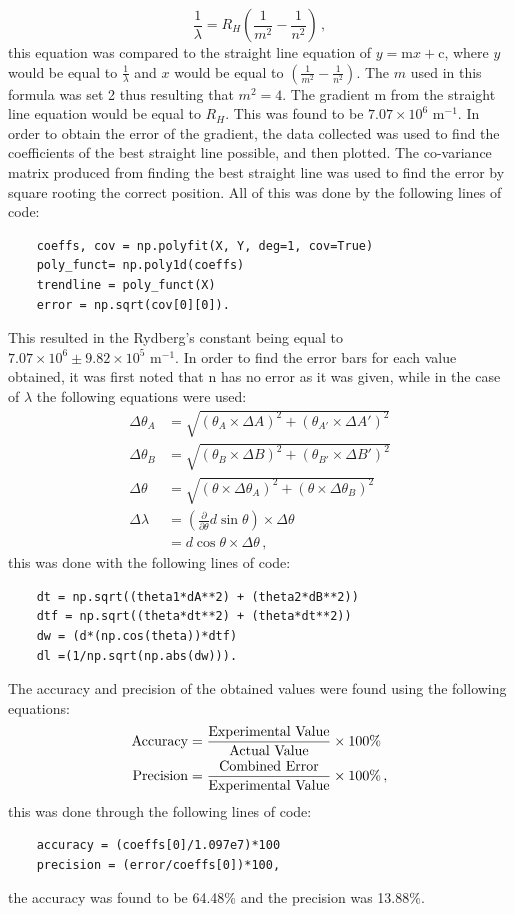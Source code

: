 \documentclass[12pt, a4paper]{article}
\begin{document}
\begin{equation*}
    \frac{1}{\lambda}=R_H\left(\frac{1}{m^2}-\frac{1}{n^2}\right)\,,
\end{equation*}
this equation was compared to the straight line equation of $y=\text{m}x+\text{c}$, where $y$ would be equal to $\frac{1}{\lambda}$ and $x$ would be equal to $\left(\frac{1}{m^2}-\frac{1}{n^2}\right)$. The $m$ used in this formula was set 2 thus resulting that $m^2=4$. The gradient m from the straight line equation would be equal to $R_H$. This was found to be $7.07\times10^6\text{ m}^{-1}$. In order to obtain the error of the gradient, the data collected was used to find the coefficients of the best straight line possible, and then plotted. The co-variance matrix produced from finding the best straight line was used to find the error by square rooting the correct position. All of this was done by the following lines of code:
\begin{lstlisting}
    coeffs, cov = np.polyfit(X, Y, deg=1, cov=True)
    poly_funct= np.poly1d(coeffs)
    trendline = poly_funct(X)
    error = np.sqrt(cov[0][0]).
\end{lstlisting}
This resulted in the Rydberg's constant being equal to $7.07\times10^6 \pm 9.82\times10^5 \text{ m}^{-1}$. In order to find the error bars for each value obtained, it was first noted that n has no error as it was given, while in the case of $\lambda$ the following equations were used:
\begin{align*}
    \Delta\theta_A &= \sqrt{(\theta_A \times \Delta A)^2 + (\theta_{A'} \times \Delta A')^2}\\
    \Delta\theta_B &= \sqrt{(\theta_B \times \Delta B)^2 + (\theta_{B'} \times \Delta B')^2}\\
    \Delta\theta &= \sqrt{(\theta \times \Delta\theta_A)^2 + (\theta \times \Delta\theta_B)^2}\\
    \Delta\lambda &= \left(\frac{\partial}{\partial\theta}d\sin{\theta}\right) \times \Delta\theta\\
    &= d\cos{\theta}\times \Delta\theta\,,
\end{align*}
this was done with the following lines of code:
\begin{lstlisting}
    dt = np.sqrt((theta1*dA**2) + (theta2*dB**2))
    dtf = np.sqrt((theta*dt**2) + (theta*dt**2))
    dw = (d*(np.cos(theta))*dtf)
    dl =(1/np.sqrt(np.abs(dw))).
\end{lstlisting}
The accuracy and precision of the obtained values were found using the following equations:
\begin{align*}
    \text{Accuracy} &= \frac{\text{Experimental Value}}{\text{Actual Value}} \times 100\% \\
    \smallskip
    \text{Precision}&=\frac{\text{Combined Error}}{\text{Experimental Value}} \times 100\% \,,
\end{align*}
this was done through the following lines of code:
\begin{lstlisting}
    accuracy = (coeffs[0]/1.097e7)*100
    precision = (error/coeffs[0])*100,
\end{lstlisting}
the accuracy was found to be 64.48\% and the precision was 13.88\%.
\end{document}
